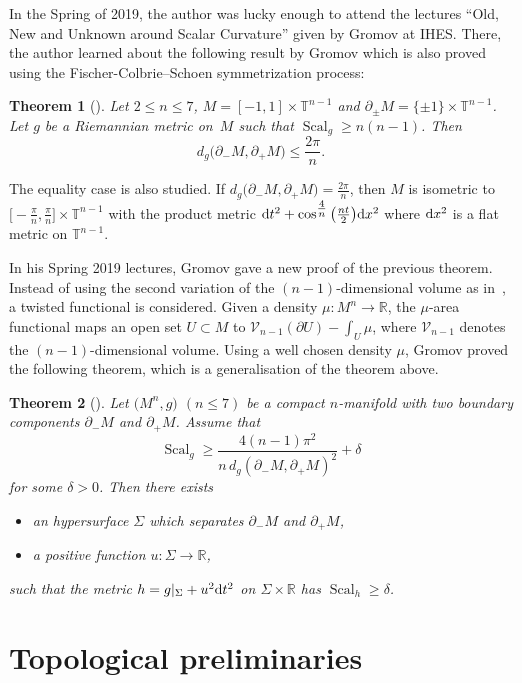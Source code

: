 \documentclass[10pt,a4paper]{amsart}
\numberwithin{equation}{section}
\newtheorem{thm}{Theorem}[section]
\DeclareMathOperator{\scal}{Scal}
\begin{document}
In the Spring of 2019, the author was lucky enough to attend the
lectures ``Old, New and Unknown around Scalar Curvature'' given by
Gromov at IHES. There, the author learned about the following result by
Gromov which is also proved using the Fischer-Colbrie--Schoen
symmetrization process:
\begin{thm}[{\cite[p.~2]{gromov2018metric}}]
 Let $2\leq n\leq 7$, $M=[-1,1]\times \mathbb{T}^{n-1}$ and
 $\partial_{\pm}M=\{\pm 1\}\times \mathbb{T}^{n-1}$.
 Let $g$ be a Riemannian metric on~$M$
 such that $\scal_g\geq n(n-1)$. Then
 \[d_g\big(\partial_-M,\partial_+M\big)\leq\frac{2\pi}{n}. \]
\end{thm}
The equality case is also studied. If $d_g\big(\partial_-M,\partial_+M\big)=\frac{2\pi}{n}$, then $M$ is isometric to
$\big[{-}\tfrac{\pi}{n},\tfrac{\pi}{n}\big]\times\mathbb{T}^{n-1}$
with the product metric ${\rm d}t^2 + \cos^{\tfrac{4}{n}}\big(\frac{nt}{2}\big){\rm d}x^2$
where ${\rm d}x^2$ is a flat metric on $\mathbb{T}^{n-1}$.

In his Spring 2019 lectures, Gromov gave a new proof of the previous
theorem. Instead of using the second variation of the
$(n-1)$-dimensional volume as in~\cite{gromov2018metric}, a twisted
functional is considered. Given a density $\mu\colon M^n\to\mathbb{R}$, the
$\mu$-area functional maps an open set $U\subset M$ to
$\mathcal{V}_{n-1}(\partial U)-\int_U\mu$, where $\mathcal{V}_{n-1}$
denotes the $(n-1)$-dimensional volume. Using a well chosen
density $\mu$, Gromov proved the following theorem, which is a
generalisation of the theorem above.
\begin{thm}[{\cite[Section~5.3]{gromov2019four}}]\label{thm-gro}
 Let $\big(M^n,g\big)$ $(n\leq 7)$ be a compact $n$-manifold with two boundary components $\partial_-M$
 and $\partial_+M$. Assume that
 \[\scal_g\geq \frac{4(n-1)\pi^2}{n\, d_g(\partial_-M,
 \partial_+M)^2}+\delta\]
 for some $\delta>0$. Then there exists
 \begin{itemize}\itemsep=0pt
 \item an hypersurface $\Sigma$ which separates
 $\partial_-M$ and $\partial_+M$,
 \item a positive function
 $u\colon \Sigma\to\mathbb{R}$,
 \end{itemize}
 such that the metric
 $h=g|_{\Sigma}+u^2{\rm d}t^2$ on $\Sigma\times\mathbb{R}$ has $\scal_h\geq \delta$.
\end{thm}

\section{Topological preliminaries}
\label{sec:topol-prel}
\end{document}
